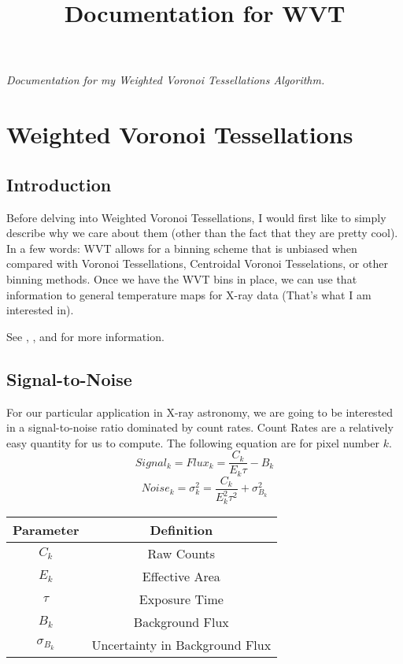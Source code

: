\documentclass[11pt,letterpaper]{article}
\begin{document}
\univlogo

\title{Documentation for WVT}

\textit{Documentation for my Weighted Voronoi Tessellations Algorithm.}

\tableofcontents

\newpage


\newpage
\section{Weighted Voronoi Tessellations}

\subsection{Introduction}
Before delving into Weighted Voronoi Tessellations, I would first like to simply describe why we care about them (other than the fact that they are pretty cool). In a few words: WVT allows for a binning scheme that is unbiased when compared with Voronoi Tessellations, Centroidal Voronoi Tesselations, or other binning methods. Once we have the WVT bins in place, we can use that information to general temperature maps for X-ray data (That's what I am interested in).

See \cite{Copin2018}, \cite{Diehl2008}, and \cite{Sanders2018} for more information.
\subsection{Signal-to-Noise}
For our particular application in X-ray astronomy, we are going to be interested in a signal-to-noise ratio dominated by count rates. Count Rates are a relatively easy quantity for us to compute.
The following equation are for pixel number $k$.
\begin{equation}\label{eqn:signal}
	Signal_k = Flux_k = \frac{C_k}{E_k \tau}-B_k
\end{equation}
\begin{equation}\label{eqn:noise}
	Noise_k = \sigma^2_k = \frac{C_k}{E^2_k\tau^2}+\sigma^2_{B_k}
\end{equation}

\begin{center}
	\begin{tabular}{|c|c|}
		\hline 
		Parameter & Definition \\
		\hline
		\hline
		$C_k$ & Raw Counts \\
		\hline 
		$E_k$ & Effective Area \\
		\hline 
		$\tau$ & Exposure Time \\
		\hline
		$B_k$ & Background Flux \\
		\hline 
		$\sigma_{B_k}$ & Uncertainty in Background Flux \\
		\hline
	\end{tabular}
\end{center}
\end{document}
